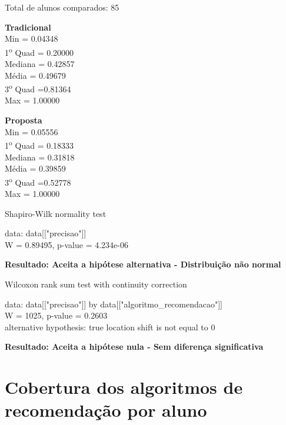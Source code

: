 \noindent
Total de alunos comparados: 85

\begin{multicols}{2}

\noindent\textbf{Tradicional}\\
Min = 0.04348\\
1\textsuperscript{o} Quad = 0.20000\\
Mediana = 0.42857\\
Média = 0.49679\\
3\textsuperscript{o} Quad =0.81364\\
Max = 1.00000\\

\columnbreak

\noindent\textbf{Proposta}\\
Min = 0.05556\\
1\textsuperscript{o} Quad = 0.18333\\
Mediana = 0.31818\\
Média = 0.39859\\
3\textsuperscript{o} Quad =0.52778\\
Max = 1.00000
\end{multicols}

  Shapiro-Wilk normality test

\noindent
data:  data[["precisao"]]\\
W = 0.89495, p-value = 4.234e-06

\noindent
\textbf{Resultado: Aceita a hipótese alternativa - Distribuição não normal}

Wilcoxon rank sum test with continuity correction

\noindent
data:  data[["precisao"]] by data[["algoritmo\_recomendacao"]]\\
W = 1025, p-value = 0.2603\\
alternative hypothesis: true location shift is not equal to 0

\noindent
\textbf{Resultado: Aceita a hipótese nula - Sem diferença significativa}

\newpage
\section{Cobertura dos algoritmos de recomendação por aluno}

